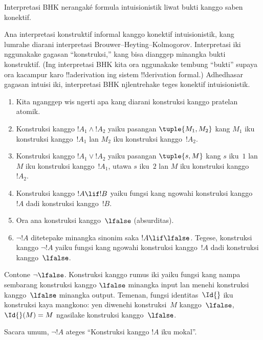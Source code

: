 \documentclass[../../../include/open-logic-section]{subfiles}
\begin{document}


\begin{editorial}
Interpretasi BHK nerangaké formula intuisionistik liwat bukti kanggo saben konektif.
\end{editorial}

Ana interpretasi konstruktif informal kanggo konektif intuisionistik,
kang lumrahe diarani interpretasi Brouwer--Heyting--Kolmogorov.
Interpretasi iki nggunakake gagasan ``konstruksi,'' kang bisa dianggep
minangka bukti konstruktif. (Ing interpretasi BHK kita ora nggunakake
tembung ``bukti'' supaya ora kacampur karo !!a{derivation} ing sistem
!!{derivation} formal.) Adhedhasar gagasan intuisi iki, interpretasi
BHK njlentrehake teges konektif intuisionistik.

\begin{enumerate}
\item Kita nganggep wis ngerti apa kang diarani konstruksi kanggo
  pratelan atomik.
\item Konstruksi kanggo $!A_1 \land !A_2$ yaiku pasangan $\tuple{M_1, M_2}$
  kang $M_1$ iku konstruksi kanggo~$!A_1$ lan $M_2$ iku konstruksi
  kanggo~$!A_2$.
\item Konstruksi kanggo $!A_1 \lor !A_2$ yaiku pasangan $\tuple{s, M}$
  kang $s$ iku~$1$ lan $M$ iku konstruksi kanggo~$!A_1$, utawa $s$ iku~$2$
  lan $M$ iku konstruksi kanggo~$!A_2$.
\item Konstruksi kanggo $!A \lif !B$ yaiku fungsi kang ngowahi
  konstruksi kanggo~$!A$ dadi konstruksi kanggo~$!B$.
\item Ora ana konstruksi kanggo~$\lfalse$ (absurditas).
\item $\lnot !A$ ditetepake minangka sinonim saka $!A \lif \lfalse$.
  Tegese, konstruksi kanggo $\lnot !A$ yaiku fungsi kang ngowahi
  konstruksi kanggo~$!A$ dadi konstruksi kanggo~$\lfalse$.
\end{enumerate}

\begin{ex}
Contone $\lnot \lfalse$. Konstruksi kanggo rumus iki yaiku fungsi
kang nampa sembarang konstruksi kanggo $\lfalse$ minangka input lan
menehi konstruksi kanggo~$\lfalse$ minangka output. Temenan, fungsi
identitas~$\Id{}$ iku konstruksi kaya mangkono: yen diwenehi
konstruksi~$M$ kanggo~$\lfalse$, $\Id{}(M) = M$ ngasilake
konstruksi kanggo~$\lfalse$.
\end{ex}

Sacara umum, $\lnot !A$ ateges ``Konstruksi kanggo $!A$ iku mokal''.
\end{document}
